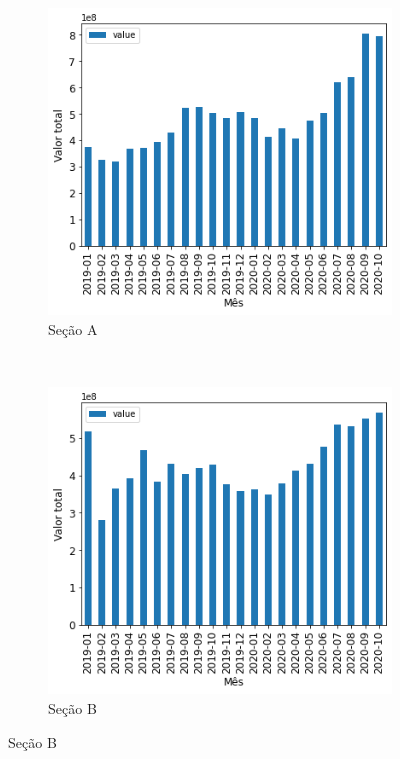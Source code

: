 \begin{figure}[htb] 
    \centering 
    \caption{Valor mensal transacionado por seção no período analisado (Parte 1)}
    \label{fig:pandemia:descritiva-16.1-valor-mensal-por-secao} 
    \begin{subfigure}[b]{0.45\textwidth}
        \includegraphics[scale=0.45]{images/base-de-dados-16.A-valor-mensal-por-secao.png}
        \caption{Seção A}
        \label{fig:pandemia:descritiva-16.A-valor-mensal-por-secao}
    \end{subfigure} ~ \quad
    \begin{subfigure}[b]{0.45\textwidth}
        \includegraphics[scale=0.45]{images/base-de-dados-16.B-valor-mensal-por-secao.png}
        \caption{Seção B}
        \label{fig:pandemia:descritiva-16.B-valor-mensal-por-secao}

\end{subfigure}
\end{figure}
